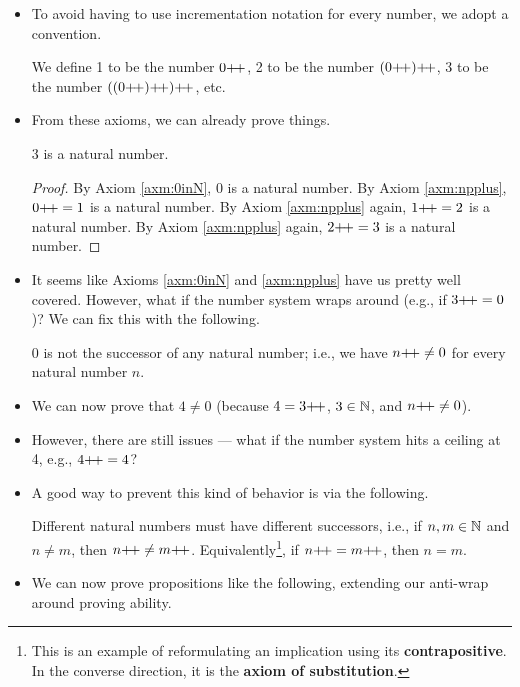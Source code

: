 \documentclass[../main.tex]{subfiles}
\begin{document}
\begin{itemize}
\begin{axm}
    \end{axm}
    \item To avoid having to use incrementation notation for every number, we adopt a convention.
    \begin{defn}
        We define 1 to be the number $0{+\!+}$, 2 to be the number $(0{+\!+}){+\!+}$, 3 to be the number $((0{+\!+}){+\!+}){+\!+}$, etc.
    \end{defn}
    \item From these axioms, we can already prove things.
    \begin{prop}
        3 is a natural number.
        \begin{proof}
            By Axiom \ref{axm:0inN}, 0 is a natural number. By Axiom \ref{axm:npplus}, $0{+\!+}=1$ is a natural number. By Axiom \ref{axm:npplus} again, $1{+\!+}=2$ is a natural number. By Axiom \ref{axm:npplus} again, $2{+\!+}=3$ is a natural number.
        \end{proof}
    \end{prop}
    \item It seems like Axioms \ref{axm:0inN} and \ref{axm:npplus} have us pretty well covered. However, what if the number system wraps around (e.g., if $3{+\!+}=0$)? We can fix this with the following.
    \begin{axm}\label{axm:0NotSuccessor}
        0 is not the successor of any natural number; i.e., we have $n{+\!+}\neq 0$ for every natural number $n$.
    \end{axm}
    \item We can now prove that $4\neq 0$ (because $4=3{+\!+}$, $3\in\mathbb{N}$, and $n{+\!+}\neq 0$).
    \item However, there are still issues --- what if the number system hits a ceiling at 4, e.g., $4{+\!+}=4$?
    \item A good way to prevent this kind of behavior is via the following.
    \begin{axm}\label{axm:successorDistinctness}
        Different natural numbers must have different successors, i.e., if $n,m\in\mathbb{N}$ and $n\neq m$, then $n{+\!+}\neq m{+\!+}$. Equivalently\footnote{This is an example of reformulating an implication using its \textbf{contrapositive}. In the converse direction, it is the \textbf{axiom of substitution}.}, if $n{+\!+}=m{+\!+}$, then $n=m$.
    \end{axm}
    \item We can now prove propositions like the following, extending our anti-wrap around proving ability.
    \begin{prop}

\end{prop}
\end{itemize}
\end{document}
